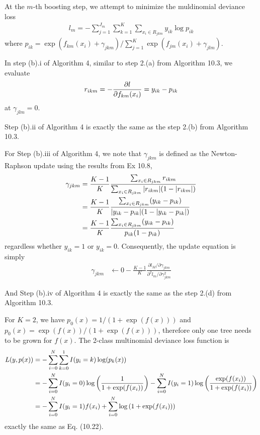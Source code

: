 \begin{exercise}
  At the $m$-th boosting step, we attempt to
  minimize the muldinomial deviance loss
  \begin{align}
    l_m = -\sum_{j=1}^{J_m} \sum_{k=1}^K \sum_{x_i\in R_{jkm}}y_{ik}\log
    p_{ik}
  \end{align}
  where $p_{ik} =\exp(f_{km}(x_i) +
  \gamma_{jkm})/\sum_{j=1}^K\exp(f_{jm}(x_i) + \gamma_{jlm})$.
  
  In step (b).i of Algorithm 4, similar to step 2.(a) from Algorithm 10.3, we
  evaluate
  \begin{align}
    r_{ikm} = -\pdv{l}{f_{km}(x_i)} = y_{ik}-p_{ik}
  \end{align}
  at $\gamma_{jlm}=0$.
  
  Step (b).ii of Algorithm 4 is exactly the same as the step 2.(b) from
  Algorithm 10.3.
  
  For Step (b).iii of Algorithm 4, we note that $\gamma_{jkm}$ is defined as the
  Newton-Raphson update using the results from Ex 10.8, 
  \begin{align}
    \gamma_{jkm} & = \frac{K-1}{K}\frac{\sum_{x_i\in R_{jkm}} r_{ikm}}
    {\sum_{x_i\in R_{jkm}} |r_{ikm}|(1 - |r_{ikm}|)} \notag\\
    &= \frac{K-1}{K} \frac{\sum_{x_i\in R_{jkm}} (y_{ik}-p_{ik})}
    {|y_{ik}-p_{ik}| (1 - |y_{ik}-p_{ik}|)} \notag\\
    &= \frac{K-1}{K} \frac{\sum_{x_i\in R_{jkm}} (y_{ik}-p_{ik})}
    {p_{ik} (1 - p_{ik})} 
  \end{align}
  regardless whether $y_{ik}=1$ or $y_{ik}=0$. Consequently, the update equation
  is simply
  \begin{align}
    \gamma_{jkm} & \leftarrow
    0-\frac{K-1}{K}\frac{\partial{l_M}/\partial{\gamma_{jkm}}}
    {\partial^2{l_m}/\partial{\gamma_{jkm}^2}}
  \end{align}
  
  And Step (b).iv of Algorithm 4 is exactly the same as the step 2.(d) from
  Algorithm 10.3.
\end{exercise}

\begin{exercise}
  For $K=2$, we have $p_0(x) = 1/(1+\exp(f(x)))$ and $p_0(x) =
  \exp(f(x))/(1+\exp(f(x)))$, therefore only one tree needs to be grown for
  $f(x)$. The 2-class multinomial deviance loss function is 
  \begin{align}
    L(y, p(x)) &= -\sum_{i=0}^N\sum_{k=0}^1 I(y_i=k)\log(p_k(x)) \notag\\
    &= -\sum_{i=0}^N
    I(y_i=0)\log\left(\frac{1}{1+\exp(f(x_i))}\right) -\sum_{i=0}^N
    I(y_i=1)\log\left(\frac{\exp(f(x_i))}{1+\exp(f(x_i))}\right) \notag\\
    &= -\sum_{i=0}^N I(y_i=1) f(x_i) +
    \sum_{i=0}^N\log\left(1+\exp(f(x_i))\right)
  \end{align}
  exactly the same as Eq. (10.22).
\end{exercise}

